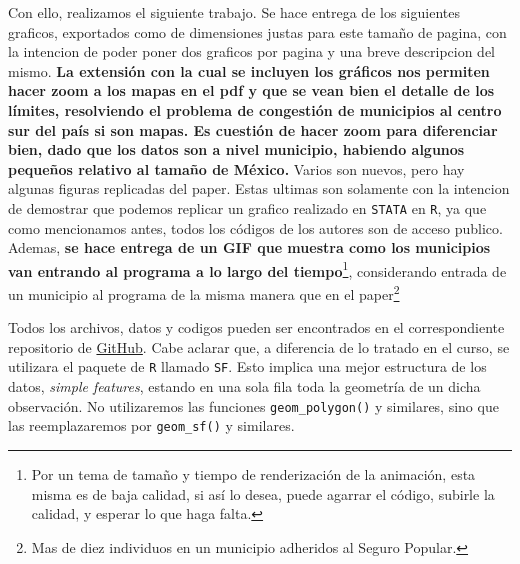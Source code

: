 \documentclass[9pt]{article}
\begin{document}
Con ello, realizamos el siguiente trabajo. Se hace entrega de los siguientes gr\’aficos, exportados como  de dimensiones justas para este tama\~no de p\’agina, con la intenci\’on de poder poner dos gr\’aficos por p\’agina y una breve descripci\’on del mismo.\textbf{ La extensi\'on con la cual se incluyen los gr\'aficos nos permiten hacer zoom a los mapas en el pdf y que se vean bien el detalle de los l\'imites, resolviendo el problema de congesti\'on de municipios al centro sur del pa\'is si son mapas. Es cuesti\'on de hacer zoom para diferenciar bien, dado que los datos son a nivel municipio, habiendo algunos peque\~nos relativo al tama\~no de M\'exico.} Varios son nuevos, pero hay algunas figuras replicadas del paper. Estas \’ultimas son solamente con la intenci\’on de demostrar que podemos replicar un gr\’afico realizado en \texttt{STATA} en \texttt{R}, ya que como mencionamos antes, todos los códigos de los autores son de acceso p\’ublico. Adem\’as, \textbf{se hace entrega de un GIF que muestra como los municipios van entrando al programa a lo largo del tiempo}\footnote{Por un tema de tama\~no y tiempo de renderizaci\'on de la animaci\'on, esta misma es de baja calidad, si as\'i lo desea, puede agarrar el c\'odigo, subirle la calidad, y esperar lo que haga falta.}, considerando entrada de un municipio al programa de la misma manera que en el paper\footnote{M\’as de diez individuos en un municipio adheridos al Seguro Popular.} 

Todos los archivos, datos y c\’odigos pueden ser encontrados en el correspondiente repositorio de \href{https://github.com/joaquinliwski/Herramientas-Computacionales-Liwski-Sury-Trabajo-Final.git}{GitHub}. Cabe aclarar que, a diferencia de lo tratado en el curso, se utilizara el paquete de \texttt{R} llamado \texttt{SF}. Esto implica una mejor estructura de los datos, \textit{simple features}, estando en una sola fila toda la geometr\'ia de un dicha observaci\'on. No utilizaremos las funciones \texttt{geom\_polygon()} y similares, sino que las reemplazaremos por \texttt{geom\_sf()} y similares. 
\end{document}
